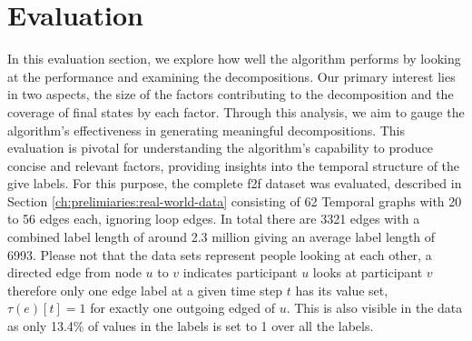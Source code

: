 
\chapter{Evaluation}
\label{ch:Evaluation}

In this evaluation section, we explore how well the algorithm performs by looking at the performance and examining the decompositions. Our primary interest lies in two aspects, the size of the factors contributing to the decomposition and the coverage of final states by each factor. Through this analysis, we aim to gauge the algorithm's effectiveness in generating meaningful decompositions. This evaluation is pivotal for understanding the algorithm's capability to produce concise and relevant factors, providing insights into the temporal structure of the give labels. For this purpose, the complete f2f dataset was evaluated, described in Section \ref{ch:prelimiaries:real-world-data} consisting of 62 Temporal graphs with 20 to 56 edges each, ignoring loop edges. In total there are 3321 edges with a combined label length of around 2.3 million giving an average label length of 6993. Please not that the data sets represent people looking at each other, a directed edge from node $u$ to $v$ indicates participant $u$ looks at participant $v$ therefore only one edge label at a given time step $t$ has its value set, $\tau(e)[t] = 1$ for exactly one outgoing edged of $u$. This is also visible in the data as only 13.4\% of values in the labels is set to 1 over all the labels.

